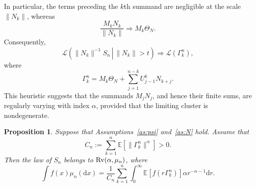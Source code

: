 \documentclass[preprint,12pt]{elsarticle}
\newtheorem{prop}[thm]{Proposition}
\theoremstyle{definition}
\theoremstyle{remark}
\newcommand{\Mbf}{{ M}}
\newcommand{\Ubf}{{ U}}
\newcommand{\Nbf}{{ N}}
\newcommand{\Sbf}{{ S}}
\newcommand{\1}{{\mathbf 1}}
\numberwithin{equation}{section}
\newcommand{\Ebb}{\mathbb{E}}  %
\newcommand{\Rvrm}{{\rm Rv}}
\begin{document}
  In particular, the terms preceding the $k$th summand are negligible at
  the scale $\|\Nbf_k\|$, whereas
  \begin{equation*}
    \frac{\Mbf_k\Nbf_k}{\|\Nbf_k\|}
    \Longrightarrow
    \Mbf_k\Theta_\Nbf.
  \end{equation*}
  Consequently,
  \begin{equation*}
    \mathcal{L}\left(
      \left.
      \|\Nbf_k\|^{-1}\Sbf_n
      \,\right|\,
      \|\Nbf_k\|>t
    \right)
    \Longrightarrow
    \mathcal{L}\left(\Gamma_k^n\right),
  \end{equation*}
  where
  \begin{equation*}\label{eq:4:gammank}
    \Gamma_k^n
    =
    \Mbf_k\Theta_\Nbf
    +
    \sum_{j=1}^{n-k}
    \Ubf_{j-1}^k\Nbf_{k+j}.
  \end{equation*}
  This heuristic suggests that the summands $\Mbf_j\Nbf_j$, and hence their
  finite sums, are regularly varying with index $\alpha$, provided that the
  limiting cluster is nondegenerate.

      \begin{prop}
    Suppose that Assumptions~\ref{as:psi} and~\ref{as:N} hold. 
    Assume that
    \begin{equation*}
      C_n
      :=
      \sum_{k=1}^n
      \Ebb[\|\Gamma_k^n\|^\alpha]
      >0.
    \end{equation*}
    Then the law of $\Sbf_n$ belongs to
    $\Rvrm(\alpha,\mu_n)$, where 
    \begin{equation*}
      \int f(x) \mu_n(\mathrm{d}x)
      =
      \frac{1}{C_n}
      \sum_{k=1}^n
      \int_0^\infty\Ebb\left[
        f(r\Gamma_k^n)
      \right]\alpha r^{-\alpha-1}\mathrm{d}r.
    \end{equation*}
  \end{prop}
\end{document}
